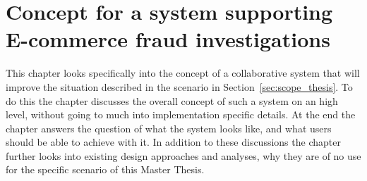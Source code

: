 
\chapter{Concept for a system supporting \gls{E-commerce} fraud investigations} %
\label{cha:system_concept}

This chapter looks specifically into the concept of a collaborative system that will improve the situation described in the scenario in Section~\ref{sec:scope_thesis}. To do this the chapter discusses the overall concept of such a system on an high level, without going to much into implementation specific details. At the end the chapter answers the question of what the system looks like, and what users should be able to achieve with it. In addition to these discussions the chapter further looks into existing design approaches and analyses, why they are of no use for the specific scenario of this Master Thesis.












